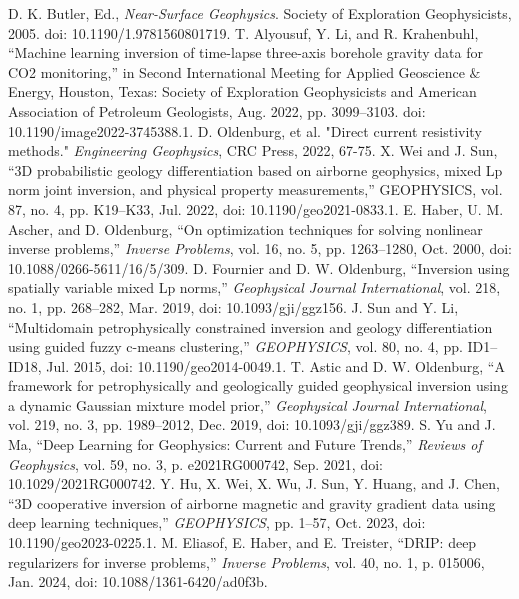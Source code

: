 \documentclass[lettersize,journal]{IEEEtran}
\begin{document}
\begin{thebibliography}{1}

D. K. Butler, Ed., \textit{Near-Surface Geophysics}. Society of Exploration Geophysicists, 2005. doi: 10.1190/1.9781560801719.
T. Alyousuf, Y. Li, and R. Krahenbuhl, “Machine learning inversion of time-lapse three-axis borehole gravity data for CO2 monitoring,” in Second International Meeting for Applied Geoscience $\&$ Energy, Houston, Texas: Society of Exploration Geophysicists and American Association of Petroleum Geologists, Aug. 2022, pp. 3099–3103. doi: 10.1190/image2022-3745388.1.
D. Oldenburg, et al. "Direct current resistivity methods." \textit{Engineering Geophysics}, CRC Press, 2022, 67-75.
X. Wei and J. Sun, “3D probabilistic geology differentiation based on airborne geophysics, mixed Lp norm joint inversion, and physical property measurements,” GEOPHYSICS, vol. 87, no. 4, pp. K19–K33, Jul. 2022, doi: 10.1190/geo2021-0833.1.
E. Haber, U. M. Ascher, and D. Oldenburg, “On optimization techniques for solving nonlinear inverse problems,” \textit{Inverse Problems}, vol. 16, no. 5, pp. 1263–1280, Oct. 2000, doi: 10.1088/0266-5611/16/5/309.
D. Fournier and D. W. Oldenburg, “Inversion using spatially variable mixed Lp norms,” \textit{Geophysical Journal International}, vol. 218, no. 1, pp. 268–282, Mar. 2019, doi: 10.1093/gji/ggz156.
J. Sun and Y. Li, “Multidomain petrophysically constrained inversion and geology differentiation using guided fuzzy c-means clustering,” \textit{GEOPHYSICS}, vol. 80, no. 4, pp. ID1–ID18, Jul. 2015, doi: 10.1190/geo2014-0049.1.
T. Astic and D. W. Oldenburg, “A framework for petrophysically and geologically guided geophysical inversion using a dynamic Gaussian mixture model prior,” \textit{Geophysical Journal International}, vol. 219, no. 3, pp. 1989–2012, Dec. 2019, doi: 10.1093/gji/ggz389.
S. Yu and J. Ma, “Deep Learning for Geophysics: Current and Future Trends,” \textit{Reviews of Geophysics}, vol. 59, no. 3, p. e2021RG000742, Sep. 2021, doi: 10.1029/2021RG000742.
Y. Hu, X. Wei, X. Wu, J. Sun, Y. Huang, and J. Chen, “3D cooperative inversion of airborne magnetic and gravity gradient data using deep learning techniques,” \textit{GEOPHYSICS}, pp. 1–57, Oct. 2023, doi: 10.1190/geo2023-0225.1.
M. Eliasof, E. Haber, and E. Treister, “DRIP: deep regularizers for inverse problems,” \textit{Inverse Problems}, vol. 40, no. 1, p. 015006, Jan. 2024, doi: 10.1088/1361-6420/ad0f3b.

\end{thebibliography}
\end{document}
